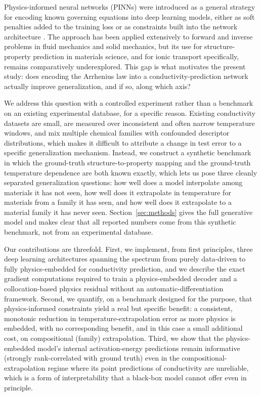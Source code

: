\documentclass[11pt]{article}
\begin{document}
Physics-informed neural networks (PINNs) were introduced as a general strategy for encoding known governing equations into deep learning models, either as soft penalties added to the training loss or as constraints built into the network architecture \citep{raissi2019pinn,karniadakis2021piml,faroughi2024pgnn}. The approach has been applied extensively to forward and inverse problems in fluid mechanics and solid mechanics, but its use for structure-property prediction in materials science, and for ionic transport specifically, remains comparatively underexplored. This gap is what motivates the present study: does encoding the Arrhenius law into a conductivity-prediction network actually improve generalization, and if so, along which axis?

We address this question with a controlled experiment rather than a benchmark on an existing experimental database, for a specific reason. Existing conductivity datasets are small, are measured over inconsistent and often narrow temperature windows, and mix multiple chemical families with confounded descriptor distributions, which makes it difficult to attribute a change in test error to a specific generalization mechanism. Instead, we construct a synthetic benchmark in which the ground-truth structure-to-property mapping and the ground-truth temperature dependence are both known exactly, which lets us pose three cleanly separated generalization questions: how well does a model interpolate among materials it has not seen, how well does it extrapolate in temperature for materials from a family it has seen, and how well does it extrapolate to a material family it has never seen. Section~\ref{sec:methods} gives the full generative model and makes clear that all reported numbers come from this synthetic benchmark, not from an experimental database.

Our contributions are threefold. First, we implement, from first principles, three deep learning architectures spanning the spectrum from purely data-driven to fully physics-embedded for conductivity prediction, and we describe the exact gradient computations required to train a physics-embedded decoder and a collocation-based physics residual without an automatic-differentiation framework. Second, we quantify, on a benchmark designed for the purpose, that physics-informed constraints yield a real but specific benefit: a consistent, monotonic reduction in temperature-extrapolation error as more physics is embedded, with no corresponding benefit, and in this case a small additional cost, on compositional (family) extrapolation. Third, we show that the physics-embedded model's internal activation-energy predictions remain informative (strongly rank-correlated with ground truth) even in the compositional-extrapolation regime where its point predictions of conductivity are unreliable, which is a form of interpretability that a black-box model cannot offer even in principle.
\end{document}
